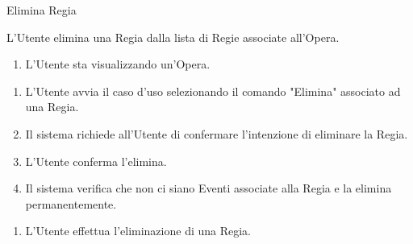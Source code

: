 {\ucExtTable	%
{	%
	Elimina Regia
	
}{	%
	
}{	%
	L'Utente elimina una Regia dalla lista di Regie associate all'Opera.
	
}{	%
	\attori
	
}{	%
	\begin{enumerate}
        \item L'Utente sta visualizzando un'Opera.
    \end{enumerate}
	
}{	%
    \begin{enumerate}
        \item L'Utente avvia il caso d'uso selezionando il comando "Elimina" associato ad una Regia.
        \item Il sistema richiede all'Utente di confermare l'intenzione di eliminare la Regia.
        \item L'Utente conferma l'elimina.
        \item Il sistema verifica che non ci siano Eventi associate alla Regia e la elimina permanentemente.
    \end{enumerate}
	
}{	%
	\begin{enumerate}
        \item L'Utente effettua l'eliminazione di una Regia.
    \end{enumerate}
	
} }

